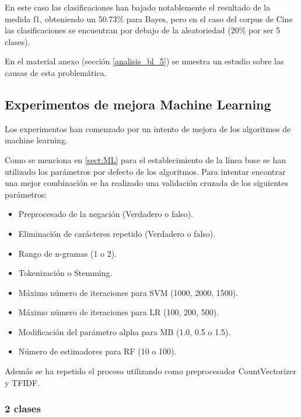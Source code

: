 En este caso las clasificaciones han bajado notablemente el resultado de la medida f1, obteniendo un 50.73\% para Bayes, pero en el caso del corpus de Cine las clasificaciones se encuentran por debajo de la aleatoriedad (20\% por ser 5 clases).

En el material anexo (sección \ref{analisis_bl_5}) se muestra un estudio sobre las causas de esta problemática.

\subsection{Experimentos de mejora Machine Learning}

Los experimentos han comenzado por un intento de mejora de los algoritmos de machine learning.

Como se menciona en \ref{sect:ML} para el establecimiento de la línea base se han utilizado los parámetros por defecto de los algoritmos. Para intentar encontrar una mejor combinación se ha realizado una validación cruzada de los siguientes parámetros:

\begin{itemize}
	\item Preprocesado de la negación (Verdadero o falso).
	\item Eliminación de carácteres repetido (Verdadero o falso).
	\item Rango de n-gramas (1 o 2).
	\item Tokenización o Stemming.
	\item Máximo número de iteraciones para SVM (1000, 2000, 1500).
	\item Máximo número de iteraciones para LR (100, 200, 500).
	\item Modificación del parámetro alpha para MB (1.0, 0.5 o 1.5).
	\item Número de estimadores para RF (10 o 100).
\end{itemize}

Además se ha repetido el proceso utilizando como preprocesador CountVectorizer y TFIDF.



\subsubsection{2 clases}

